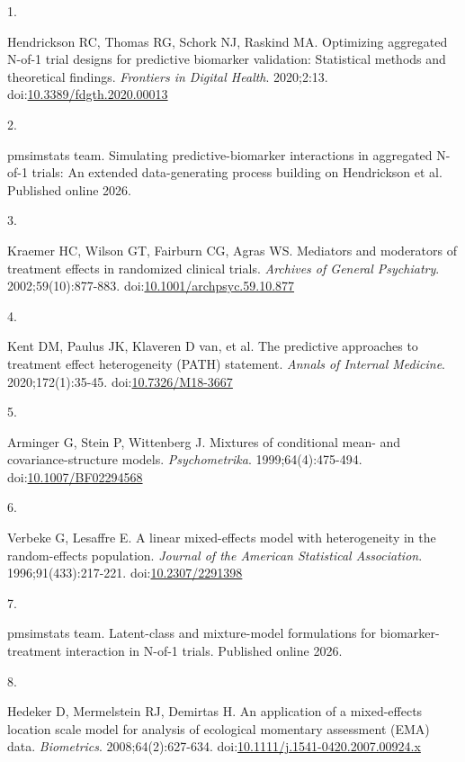 \documentclass[
  11pt,
]{article}
\newlength{\cslhangindent}
\newlength{\csllabelwidth}
\newenvironment{CSLReferences}[2] %
 {\begin{list}{}{%
  \setlength{\itemindent}{0pt}
  \setlength{\leftmargin}{0pt}
  \setlength{\parsep}{0pt}
  \ifodd #1
   \setlength{\leftmargin}{\cslhangindent}
   \setlength{\itemindent}{-1\cslhangindent}
  \fi
  \setlength{\itemsep}{#2\baselineskip}}}
 {\end{list}}
\newcommand{\CSLLeftMargin}[1]{\parbox[t]{\csllabelwidth}{\strut#1\strut}}
\newcommand{\CSLRightInline}[1]{\parbox[t]{\linewidth - \csllabelwidth}{\strut#1\strut}}
\begin{document}
\protect{}\label{refs}
\begin{CSLReferences}{0}{1}
\CSLLeftMargin{1. }%
\CSLRightInline{Hendrickson RC, Thomas RG, Schork NJ, Raskind MA. Optimizing aggregated {N}-of-1 trial designs for predictive biomarker validation: Statistical methods and theoretical findings. \emph{Frontiers in Digital Health}. 2020;2:13. doi:\href{https://doi.org/10.3389/fdgth.2020.00013}{10.3389/fdgth.2020.00013}}

\CSLLeftMargin{2. }%
\CSLRightInline{{pmsimstats team}. Simulating predictive-biomarker interactions in aggregated {N}-of-1 trials: An extended data-generating process building on {Hendrickson} et al. Published online 2026.}

\CSLLeftMargin{3. }%
\CSLRightInline{Kraemer HC, Wilson GT, Fairburn CG, Agras WS. Mediators and moderators of treatment effects in randomized clinical trials. \emph{Archives of General Psychiatry}. 2002;59(10):877-883. doi:\href{https://doi.org/10.1001/archpsyc.59.10.877}{10.1001/archpsyc.59.10.877}}

\CSLLeftMargin{4. }%
\CSLRightInline{{Kent DM, Paulus JK, Klaveren D van, et al.} The predictive approaches to treatment effect heterogeneity ({PATH}) statement. \emph{Annals of Internal Medicine}. 2020;172(1):35-45. doi:\href{https://doi.org/10.7326/M18-3667}{10.7326/M18-3667}}

\CSLLeftMargin{5. }%
\CSLRightInline{Arminger G, Stein P, Wittenberg J. Mixtures of conditional mean- and covariance-structure models. \emph{Psychometrika}. 1999;64(4):475-494. doi:\href{https://doi.org/10.1007/BF02294568}{10.1007/BF02294568}}

\CSLLeftMargin{6. }%
\CSLRightInline{Verbeke G, Lesaffre E. A linear mixed-effects model with heterogeneity in the random-effects population. \emph{Journal of the American Statistical Association}. 1996;91(433):217-221. doi:\href{https://doi.org/10.2307/2291398}{10.2307/2291398}}

\CSLLeftMargin{7. }%
\CSLRightInline{{pmsimstats team}. Latent-class and mixture-model formulations for biomarker-treatment interaction in {N}-of-1 trials. Published online 2026.}

\CSLLeftMargin{8. }%
\CSLRightInline{Hedeker D, Mermelstein RJ, Demirtas H. An application of a mixed-effects location scale model for analysis of ecological momentary assessment ({EMA}) data. \emph{Biometrics}. 2008;64(2):627-634. doi:\href{https://doi.org/10.1111/j.1541-0420.2007.00924.x}{10.1111/j.1541-0420.2007.00924.x}}


\end{CSLReferences}
\end{document}
